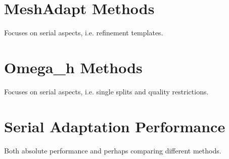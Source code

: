 \section{MeshAdapt Methods}
\label{sec:ma_methods}

Focuses on serial aspects, i.e. refinement templates.

\section{Omega\_h Methods}
\label{sec:omega_h-adapt}

Focuses on serial aspects, i.e. single splits and
quality restrictions.

\section{Serial Adaptation Performance}

Both absolute performance and perhaps comparing
different methods.



